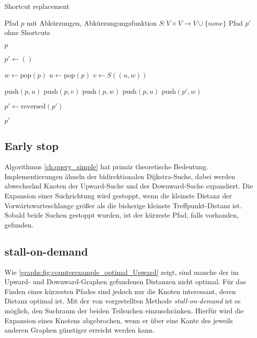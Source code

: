 \begin{algorithm}[ht]
  \caption{Shortcut replacement}
  \begin{algorithmic}[1]
    \Require Pfad $p$ mit Abkürzungen, Abkürzungungsfunktion $S \colon V \times V \to V \cup \{ {none} \}$
    \Ensure Pfad $p'$ ohne Shortcuts

    \State \Return $p$
    \EndIf
    \State

    \State $p' \leftarrow ()$
    \State

    \State $w \leftarrow \text{pop}(p)$
    \State $u \leftarrow \text{pop}(p)$
    \State $v \leftarrow S((u, w))$
    \State

    \State $\text{push}(p, u)$
    \State $\text{push}(p, v)$
    \State $\text{push}(p, w)$
    \Else
    \State $\text{push}(p, u)$
    \State $\text{push}(p', w)$
    \EndIf
    \EndWhile

    \State
    \State $p' \leftarrow \text{reversed}(p')$

    \State
    \State \Return $p'$
  \end{algorithmic}
  \label{ch:alg:shortcut_replacement}
\end{algorithm}

\subsection{Early stop}

Algorithmus \ref{ch:query_simple} hat primär theoretische Bedeutung.
Implementierungen ähneln der bidirektionalen Dijkstra-Suche, dabei werden abwechselnd Knoten der Upward-Suche und der Downward-Suche expandiert.
Die Expansion einer Suchrichtung wird gestoppt, wenn die kleinste Distanz der Vorwärtswarteschlange größer als die bisherige kleinste Treffpunkt-Distanz ist.
Sobald beide Suchen gestoppt wurden, ist der kürzeste Pfad, falls vorhanden, gefunden.

\subsection{stall-on-demand}

Wie \autoref{graphs:fig:counterexample_optimal_Upward} zeigt, sind manche der im Upward- und Downward-Graphen gefundenen Distanzen nicht optimal.
Für das Finden eines kürzesten Pfades sind jedoch nur die Knoten interessant, deren Distanz optimal ist.
Mit der von \cite{schultes2007dynamic} vorgestellten Methode \emph{stall-on-demand} ist es möglich, den Suchraum der beiden Teilsuchen einzuschränken.
Hierfür wird die Expansion eines Knotens abgebrochen, wenn er über eine Kante des jeweils anderen Graphen günstiger erreicht werden kann.

